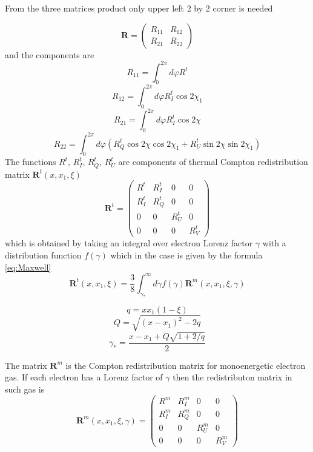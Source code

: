 \documentclass[iop, usenatbib]{emulateapj}
\newcommand{\be}{\begin{equation}}
\newcommand{\ee}{\end{equation}}
\begin{document}
From the three matrices product only upper left 2 by 2 corner is needed

\be
\bm{R}=
\left( {\begin{array}{cc}
    R_{11} & R_{12}  \\
    R_{21} & R_{22}  
    \end{array} } \right)
\ee
and the components are
$$
R_{11}=\int_0^{2\pi} d\varphi R^t 
$$$$
R_{12}=\int_0^{2\pi} d\varphi R^t_I\cos2\chi_1 
$$$$
R_{21}=\int_0^{2\pi} d\varphi R^t_I\cos2\chi 
$$$$
R_{22}=\int_0^{2\pi} d\varphi (R^t_Q\cos2\chi\cos2\chi_1 + R^t_U \sin2\chi\sin2\chi_1)
$$
The functions $R^t,\,R^t_I,\,R^t_Q,\,R^t_U$ are components of thermal Compton redistribution matrix $\bm{R}^t(x,x_1,\xi)$ 
\be
\bm{R}^t= 
\left( {\begin{array}{cccc}
    R^t & R^t_I & 0 & 0 \\
     R^t_I &  R^t_Q & 0 & 0 \\
    0 & 0 &  R^t_U & 0 \\
    0 & 0 & 0 &  R^t_V  
   \end{array} } \right)
\ee
which is obtained by taking an integral over electron Lorenz factor $\gamma$ with a distribution function $f(\gamma)$ which
in the case is given by the formula \eqref{eq:Maxwell}
\be
\bm{R}^t(x,x_1,\xi)=\frac38\int_{\gamma_*}^\infty d\gamma
f(\gamma)\bm{R}^m(x,x_1,\xi,\gamma)
\ee

$$
q=xx_1(1-\xi)$$$$
Q=\sqrt{(x-x_1)^2-2q}
$$
\be
\gamma_*=\frac{x-x_1+Q\sqrt{1+2/q}}2
\ee

The matrix $\bm{R}^m$ is the Compton redistribution matrix for monoenergetic electron gas. If each electron has a Lorenz factor of $\gamma$ then the redistributon matrix in such gas is
\be
\bm{R}^m(x,x_1,\xi,\gamma)= 
\left( {\begin{array}{cccc}
    R^m & R^m_I & 0 & 0 \\
     R^m_I &  R^m_Q & 0 & 0 \\
    0 & 0 &  R^m_U & 0 \\
    0 & 0 & 0 &  R^m_V  
   \end{array} } \right)
\ee
\end{document}
